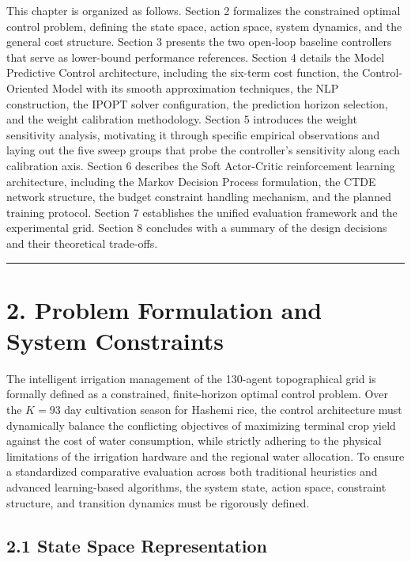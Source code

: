 This chapter is organized as follows. Section 2 formalizes the
constrained optimal control problem, defining the state space, action
space, system dynamics, and the general cost structure. Section 3
presents the two open-loop baseline controllers that serve as
lower-bound performance references. Section 4 details the Model
Predictive Control architecture, including the six-term cost function,
the Control-Oriented Model with its smooth approximation techniques, the
NLP construction, the IPOPT solver configuration, the prediction horizon
selection, and the weight calibration methodology. Section 5 introduces
the weight sensitivity analysis, motivating it through specific
empirical observations and laying out the five sweep groups that probe
the controller's sensitivity along each calibration axis. Section 6
describes the Soft Actor-Critic reinforcement learning architecture,
including the Markov Decision Process formulation, the CTDE network
structure, the budget constraint handling mechanism, and the planned
training protocol. Section 7 establishes the unified evaluation
framework and the experimental grid. Section 8 concludes with a summary
of the design decisions and their theoretical trade-offs.

\begin{center}\rule{0.5\linewidth}{0.5pt}\end{center}

\section{2. Problem Formulation and System
Constraints}\label{problem-formulation-and-system-constraints}

The intelligent irrigation management of the 130-agent topographical
grid is formally defined as a constrained, finite-horizon optimal
control problem. Over the \(K = 93\) day cultivation season for Hashemi
rice, the control architecture must dynamically balance the conflicting
objectives of maximizing terminal crop yield against the cost of water
consumption, while strictly adhering to the physical limitations of the
irrigation hardware and the regional water allocation. To ensure a
standardized comparative evaluation across both traditional heuristics
and advanced learning-based algorithms, the system state, action space,
constraint structure, and transition dynamics must be rigorously
defined.

\subsection{2.1 State Space
Representation}\label{state-space-representation}

